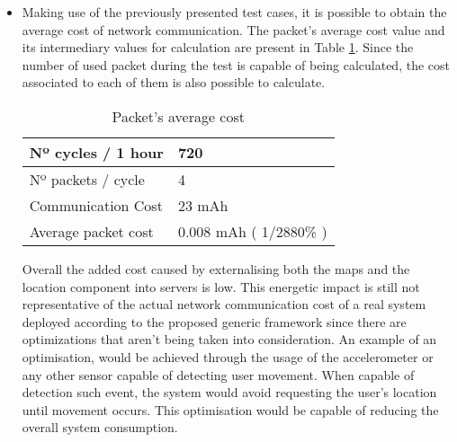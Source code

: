 \begin{itemize}
  
\item Making use of the previously presented test cases, it is possible to obtain the average cost of network communication. The packet's average cost value and its intermediary values for calculation are present in Table \ref{table:packet}. Since the number of used packet during the test is capable of being calculated, the cost associated to each of them is also possible to calculate.   
  
\begin{table}[h!]  
\centering  
\begin{tabular}{ | m{5cm} | m{5cm} | }   
\hline  
Nº cycles / 1 hour &  720 \\   
\hline  
Nº packets / cycle & 4 \\   
\hline  
Communication Cost & 23 mAh \\   
\hline  
Average packet cost & 0.008 mAh ( 1/2880\% ) \\   
\hline  
\end{tabular}  
\caption[Packet's average cost]{Packet's average cost}  
\label{table:packet}  
\end{table}  
 
 
Overall the added cost caused by externalising both the maps and the location component into servers is low. This energetic impact is still not representative of the actual network communication cost of a real system deployed according to the proposed generic framework since there are optimizations that aren't being taken into consideration. An example of an optimisation, would be achieved through the usage of the accelerometer or any other sensor capable of detecting user movement. When capable of detection such event, the system would avoid requesting the user's location until movement occurs. This optimisation would be capable of reducing the overall system consumption. 
\end{itemize}  
  
 